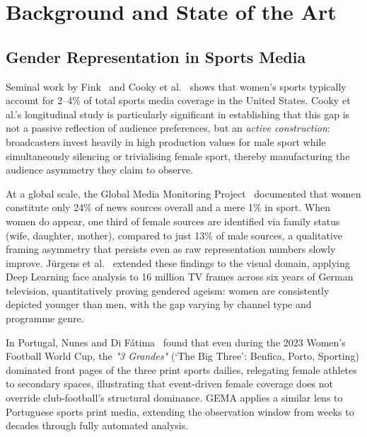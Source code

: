 \documentclass[11pt,a4paper]{article}
\begin{document}
\section{Background and State of the Art}
\label{sec:sota}

\subsection{Gender Representation in Sports Media}

Seminal work by Fink~\cite{Fink2015} and Cooky et al.~\cite{Cooky2013} shows that women's sports typically account for 2--4\% of total sports media coverage in the United States. Cooky et al.'s longitudinal study is particularly significant in establishing that this gap is not a passive reflection of audience preferences, but an \textit{active construction}: broadcasters invest heavily in high production values for male sport while simultaneously silencing or trivialising female sport, thereby manufacturing the audience asymmetry they claim to observe.

At a global scale, the Global Media Monitoring Project~\cite{WACC2010} documented that women constitute only 24\% of news sources overall and a mere 1\% in sport. When women do appear, one third of female sources are identified via family status (wife, daughter, mother), compared to just 13\% of male sources, a qualitative framing asymmetry that persists even as raw representation numbers slowly improve. Jürgens et al.~\cite{Juergens2022} extended these findings to the visual domain, applying Deep Learning face analysis to 16 million TV frames across six years of German television, quantitatively proving gendered ageism: women are consistently depicted younger than men, with the gap varying by channel type and programme genre.

In Portugal, Nunes and Di Fátima~\cite{NunesDiFatima2025} found that even during the 2023 Women's Football World Cup, the \textit{"3 Grandes"} (`The Big Three': Benfica, Porto, Sporting) dominated front pages of the three print sports dailies, relegating female athletes to secondary spaces, illustrating that event-driven female coverage does not override club-football's structural dominance. GEMA applies a similar lens to Portuguese sports print media, extending the observation window from weeks to decades through fully automated analysis.
\end{document}
